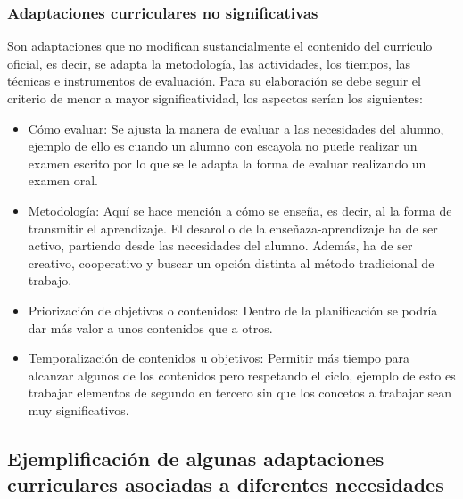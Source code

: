 \subsubsection{Adaptaciones curriculares no significativas}
Son adaptaciones que no modifican sustancialmente el contenido del currículo oficial, es decir, se adapta la metodología, las actividades, los tiempos, las técnicas e instrumentos de evaluación. Para su elaboración se debe  seguir el criterio de menor a mayor significatividad, los aspectos serían los siguientes:
\begin{itemize}
    \item Cómo evaluar: Se ajusta la manera de evaluar a las necesidades del alumno, ejemplo de ello es cuando un alumno con escayola no puede realizar un examen escrito por lo que se le adapta la forma de evaluar realizando un examen oral.
    \item Metodología: Aquí se hace mención a cómo se enseña, es decir, al la forma de transmitir el aprendizaje. El desarollo de la enseñaza-aprendizaje ha de ser activo, partiendo desde las necesidades del alumno. Además, ha de ser creativo, cooperativo y buscar un opción distinta al método tradicional de trabajo.
    \item Priorización de objetivos o contenidos: Dentro de la planificación se podría dar más valor a unos contenidos que a otros.
    \item Temporalización de contenidos u objetivos: Permitir más tiempo para alcanzar algunos de los contenidos pero respetando el ciclo, ejemplo de esto es trabajar elementos de segundo en tercero sin que los concetos a trabajar sean muy significativos.
\end{itemize}

\subsection{Ejemplificación de algunas adaptaciones curriculares asociadas a diferentes necesidades }

